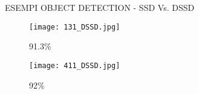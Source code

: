 \begin{frame}{ESEMPI OBJECT DETECTION - SSD Vs. DSSD}
\begin{minipage}{\linewidth}
        \hspace{0.35cm}
        \begin{minipage}{0.32\linewidth}
            \begin{figure}
                \centering
                \texttt{[image: 131\_DSSD.jpg]}
                \caption{91.3\%}
            \end{figure}
        \end{minipage}
        \hspace{-0.50cm}
        \begin{minipage}{0.32\linewidth}
            \begin{figure}
                \centering
                \texttt{[image: 411\_DSSD.jpg]}  
                \caption{92\%}
            \end{figure}
        \end{minipage}
    \end{minipage}   
\end{frame}
